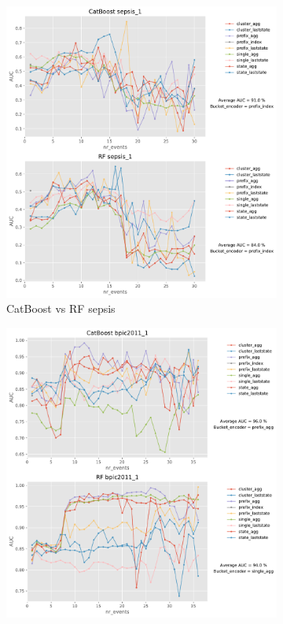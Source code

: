 \documentclass[twoside,11pt]{Latex/Classes/PhDthesisPSnPDF}
\begin{document}
\begin{figure}[t!] %
	
	\begin{subfigure}{0.48\textwidth}
		\includegraphics[width=\linewidth]{images/catboost/graphsrf/sepsis_1_CatBoost_rf.pdf}
		\caption{CatBoost vs RF sepsis} \label{fig:sepsiscr}
	\end{subfigure}\hspace*{\fill}
	\begin{subfigure}{0.48\textwidth}
		\includegraphics[width=\linewidth]{images/catboost/graphsrf/bpic2011_1_CatBoost_rf.pdf}

\end{subfigure}
\end{figure}
\end{document}
